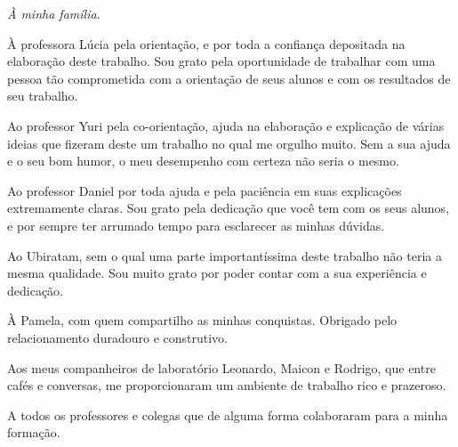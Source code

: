 \begin{flushright}
{\em 
À minha família.
}
\end{flushright}
\newpage


\hspace{5mm}

À professora Lúcia pela orientação, e por toda a confiança depositada na elaboração deste trabalho. Sou grato pela oportunidade de trabalhar com uma pessoa tão comprometida com a orientação de seus alunos e com os resultados de seu trabalho.

Ao professor Yuri pela co-orientação, ajuda na elaboração e explicação de várias ideias que fizeram deste um trabalho no qual me orgulho muito. Sem a sua ajuda e o seu bom humor, o meu desempenho com certeza não seria o mesmo.

Ao professor Daniel por toda ajuda e pela paciência em suas explicações extremamente claras. Sou grato pela dedicação que você tem com os seus alunos, e por sempre ter arrumado tempo para esclarecer as minhas dúvidas.

Ao Ubiratam, sem o qual uma parte importantíssima deste trabalho não teria a mesma qualidade. Sou muito grato por poder contar com a sua experiência e dedicação.

À Pamela, com quem compartilho as minhas conquistas. Obrigado pelo relacionamento duradouro e construtivo.

Aos meus companheiros de laboratório Leonardo, Maicon e Rodrigo, que entre cafés e conversas, me proporcionaram um ambiente de trabalho rico e prazeroso. 

A todos os professores e colegas que de alguma forma colaboraram para a minha formação.

